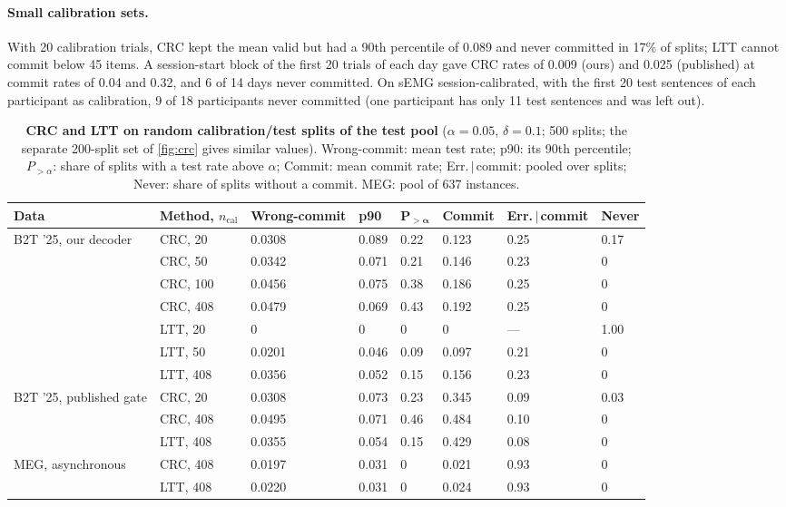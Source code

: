 \paragraph{Small calibration sets.} With 20 calibration trials, CRC kept the mean valid but had a 90th percentile of 0.089 and never committed in 17\% of splits; LTT cannot commit below 45 items. A session-start block of the first 20 trials of each day gave CRC rates of 0.009 (ours) and 0.025 (published) at commit rates of 0.04 and 0.32, and 6 of 14 days never committed. On sEMG session-calibrated, with the first 20 test sentences of each participant as calibration, 9 of 18 participants never committed (one participant has only 11 test sentences and was left out).

\begin{table}[H]
  \centering
  \caption{\textbf{CRC and LTT on random calibration/test splits of the test pool} ($\alpha = 0.05$, $\delta = 0.1$; 500 splits; the separate 200-split set of \cref{fig:crc} gives similar values). Wrong-commit: mean test rate; p90: its 90th percentile; $P_{>\alpha}$: share of splits with a test rate above $\alpha$; Commit: mean commit rate; Err.\,$|$\,commit: pooled over splits; Never: share of splits without a commit. MEG: pool of 637 instances.}
  \label{tab:crc}
  \small
  \begin{adjustbox}{max width=\linewidth}\begin{tabular}{@{}llllllll@{}}
    \toprule
    \textbf{Data} & \textbf{Method, $n_{\mathrm{cal}}$} & \textbf{Wrong-commit} & \textbf{p90} & $\boldsymbol{P_{>\alpha}}$ & \textbf{Commit} & \textbf{Err.\,$|$\,commit} & \textbf{Never} \\
    \midrule
    B2T '25, our decoder & CRC, 20 & 0.0308 & 0.089 & 0.22 & 0.123 & 0.25 & 0.17 \\
     & CRC, 50 & 0.0342 & 0.071 & 0.21 & 0.146 & 0.23 & 0 \\
     & CRC, 100 & 0.0456 & 0.075 & 0.38 & 0.186 & 0.25 & 0 \\
     & CRC, 408 & 0.0479 & 0.069 & 0.43 & 0.192 & 0.25 & 0 \\
     & LTT, 20 & 0 & 0 & 0 & 0 & --- & 1.00 \\
     & LTT, 50 & 0.0201 & 0.046 & 0.09 & 0.097 & 0.21 & 0 \\
     & LTT, 408 & 0.0356 & 0.052 & 0.15 & 0.156 & 0.23 & 0 \\
    B2T '25, published gate & CRC, 20 & 0.0308 & 0.073 & 0.23 & 0.345 & 0.09 & 0.03 \\
     & CRC, 408 & 0.0495 & 0.071 & 0.46 & 0.484 & 0.10 & 0 \\
     & LTT, 408 & 0.0355 & 0.054 & 0.15 & 0.429 & 0.08 & 0 \\
    MEG, asynchronous & CRC, 408 & 0.0197 & 0.031 & 0 & 0.021 & 0.93 & 0 \\
     & LTT, 408 & 0.0220 & 0.031 & 0 & 0.024 & 0.93 & 0 \\
    \bottomrule
  \end{tabular}\end{adjustbox}
\end{table}

